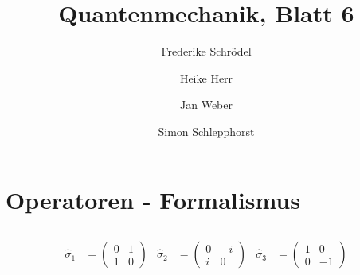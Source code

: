 \documentclass[11pt, ngerman, fleqn, DIV=15, headinclude]{scrartcl}
\title{Quantenmechanik, Blatt 6}
\author{
    Frederike Schrödel \and Heike Herr \and Jan Weber \and Simon Schlepphorst
}
\begin{document}
\maketitle

\section{Operatoren - Formalismus}

\subsection{}

\begin{align*}
	\hat{\sigma}_1&=\begin{pmatrix}
					0 & 1\\
					1 & 0
					\end{pmatrix} &
	\hat{\sigma}_2&=\begin{pmatrix}
					0& -i \\
					i& 0
					\end{pmatrix} &
	\hat{\sigma}_3&=\begin{pmatrix}
					1 & 0 \\
					0 & -1
					\end{pmatrix}	
\end{align*}
\end{document}
